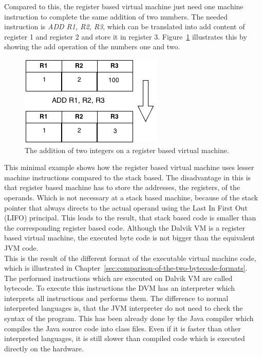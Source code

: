 Compared to this, the register based virtual machine just need one machine instruction to complete the same addition of two numbers.
The needed instruction is \textit{ADD R1, R2, R3}, which can be translated into add content of register 1 and register 2 and store it in register 3.
Figure~\ref{fig:register-based-addition} illustrates this by showing the add operation of the numbers one and two.
\begin{figure}[h]
\begin{center}
\includegraphics[scale=0.65]{images/register-based-addition.png} 
\caption{The addition of two integers on a register based virtual machine.}
\label{fig:register-based-addition}
\end{center}
\end{figure}
This minimal example shows how the register based virtual machine uses lesser machine instructions compared to the stack based.
The disadvantage in this is that register based machine has to store the addresses, the registers, of the operands.
Which is not necessary at a stack based machine, because of the stack pointer that always directs to the actual operand using the Last In First Out (LIFO) principal.
This leads to the result, that stack based code is smaller than the corresponding register based code.
Although the Dalvik VM is a register based virtual machine, the executed byte code is not bigger than the equivalent JVM code.~\cite{shi2008virtual}\\
This is the result of the different format of the executable virtual machine code, which is illustrated in Chapter~\ref{sec:comparison-of-the-two-bytecode-formats}.
\\
The performed instructions which are executed on Dalvik VM are called bytecode.
To execute this instructions the DVM has an interpreter which interprets all instructions and performs them.
The difference to normal interpreted languages is, that the JVM interpreter do not need to check the syntax of the program.
This has been already done by the Java compiler which compiles the Java source code into class files.
Even if it is faster than other interpreted languages, it is still slower than compiled code which is executed directly on the hardware.
